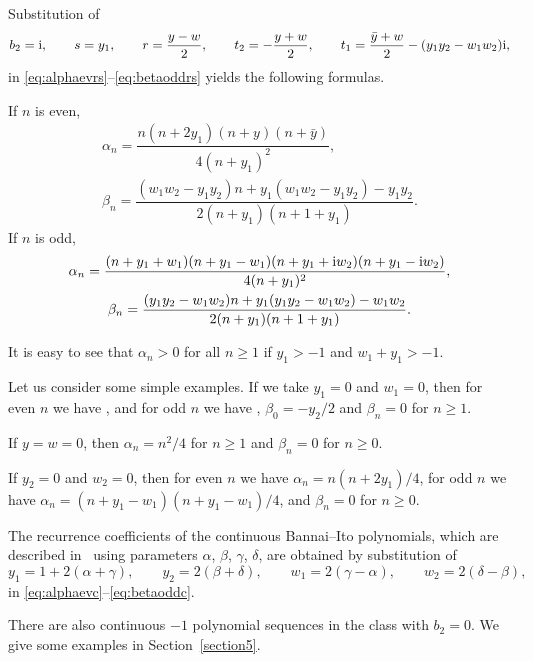 \documentclass[pdftex]{sigma}
\numberwithin{equation}{section}
\begin{document}
Substitution of{\samepage
\[ b_2={\rm i},\qquad s=y_1,\qquad r=\dfrac{y-w}{2},\qquad t_2=-\dfrac{y+w}{2},\qquad t_1=\dfrac{\bar y +w}{2} -(y_1 y_2 - w_1 w_2) {\rm i}, \]
 in \eqref{eq:alphaevrs}--\eqref{eq:betaoddrs} yields the following formulas.}

 If $ n$ is even,
 \begin{gather}\label{eq:alphaevc}
\alpha_n=\dfrac{n ( n+2 y_1) ( n + y) ( n+\bar y)}{4 (n+ y_1)^2},
\\ \label{eq:betaevc}
	 \beta_n=\dfrac{( w_1 w_2 -y_1 y_2) n +y_1 ( w_1 w_2 - y_1 y_2) - y_1 y_2}{2 (n + y_1) ( n+1 + y_1)}.
 \end{gather}
If $n$ is odd,
\begin{gather}\label{eq:alphaoddc}
	\alpha_n=\dfrac{ (n+y_1+w_1) (n+y_1 - w_1) (n+ y_1 + {\rm i} w_2) ( n+ y_1 - {\rm i} w_2)}{4 ( n+y_1)^2},
\\ \label{eq:betaoddc}
	 \beta_n=\dfrac{(y_1 y_2 - w_1 w_2) n + y_1( y_1 y_2 - w_1 w_2) -w_1 w_2}{2 ( n+y_1) ( n+1 + y_1)}.
\end{gather}

It is easy to see that $\alpha_n >0$ for all $n \ge 1$ if $ y_1>-1$ and $ w_1 + y_1 > -1$.

Let us consider some simple examples. If we take $y_1=0$ and $w_1=0$, then for even $n$ we have , and for odd $n$ we have , $\beta_0=-y_2/2$ and $\beta_n=0$ for $n\ge 1$.

If $y=w=0$, then $ \alpha_n=n^2/4$ for $n\ge 1$ and $\beta_n=0$ for $n\ge 0$.

If $y_2=0$ and $w_2=0$, then for even $n$ we have $\alpha_n=n ( n+ 2 y_1)/4$, for odd $n$ we have $\alpha_n=(n+y_1 - w_1) (n+ y_1 - w_1)/4$, and $\beta_n=0$ for $n\ge 0$.

The recurrence coefficients of the continuous Bannai--Ito polynomials, which are described in~\cite{PellVZ} using parameters $\alpha$, $\beta$, $\gamma$, $\delta$, are obtained by substitution of
\[ y_1=1+ 2 ( \alpha + \gamma),\qquad y_2=2 ( \beta + \delta),\qquad w_1=2 ( \gamma - \alpha), \qquad w_2=2 ( \delta - \beta), \]
 in \eqref{eq:alphaevc}--\eqref{eq:betaoddc}.

 There are also continuous $-1$ polynomial sequences in the class with $b_2=0$.
 We give some examples in Section~\ref{section5}.
\end{document}
